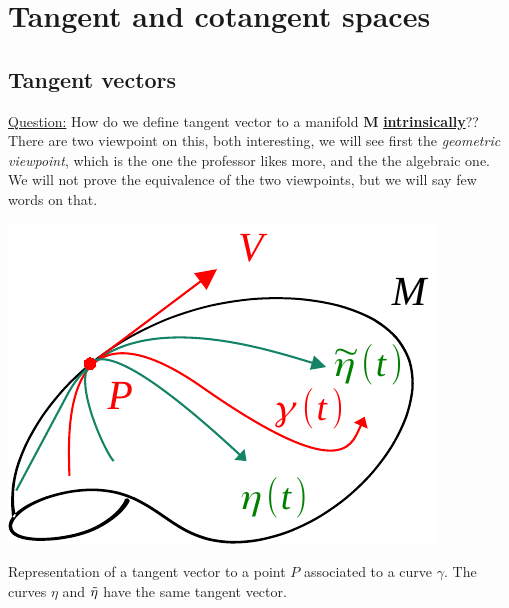 \documentclass[../main.tex]{subfiles}
\begin{document}
{}
\setchapterpreamble[u]{\margintoc}
\chapter[Tangent and cotangent spaces]{Tangent and cotangent spaces}
\section{Tangent vectors}
\underline{Question:} How do we define tangent vector to a manifold $\mathbf{M}$ \underline{\textbf{intrinsically}}?? There are two viewpoint on this, both interesting, we will see first the \textit{geometric viewpoint}, which is the one the professor likes more, and the the algebraic one. We will not prove the equivalence of the two viewpoints, but we will say few words on that.
\begin{marginfigure}[20mm]
	\includegraphics{images/tan_int.pdf}
	\caption[Representatio of a tangent vector.]{Representation of a tangent vector to a point $P$ associated to a curve $\gamma$. The curves $\eta$ and $\Tilde{\eta}$ have the same tangent vector.}
\end{marginfigure} 
\end{document}
